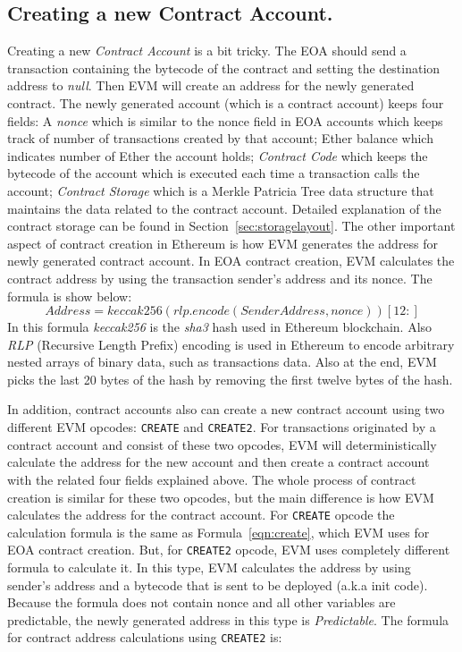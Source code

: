 \subsection{Creating a new Contract Account.}
Creating a new \textit{Contract Account} is a bit tricky. The EOA should send a transaction containing the bytecode of the contract and setting the destination address to \emph{null}. Then EVM will create an address for the newly generated contract. The newly generated account (which is a contract account) keeps four fields: A \textit{nonce} which is similar to the nonce field in EOA accounts which keeps track of number of transactions created by that account; Ether balance which indicates number of Ether the account holds; \textit{Contract Code} which keeps the bytecode of the account which is executed each time a transaction calls the account; \textit{Contract Storage} which is a Merkle Patricia Tree data structure that maintains the data related to the contract account. Detailed explanation of the contract storage can be found in Section~\ref{sec:storagelayout}. 
The other important aspect of contract creation in Ethereum is how EVM generates the address for newly generated contract account. In EOA contract creation, EVM calculates the contract address by using the transaction sender's address and its nonce. The formula is show below:
\begin{equation}
    \label{eqn:create}
    Address = keccak256(rlp.encode(Sender Address, nonce))[12:]
\end{equation}
In this formula \textit{keccak256} is the \textit{sha3} hash used in Ethereum blockchain. Also \textit{RLP} (Recursive Length Prefix) encoding is used in Ethereum to encode arbitrary nested arrays of binary data, such as transactions data. Also at the end, EVM picks the last 20 bytes of the hash by removing the first twelve bytes of the hash.

In addition, contract accounts also can create a new contract account using two different EVM opcodes: \texttt{CREATE} and \texttt{CREATE2}. For transactions originated by a contract account and consist of these two opcodes, EVM will deterministically calculate the address for the new account and then create a contract account with the related four fields explained above. The whole process of contract creation is similar for these two opcodes, but the main difference is how EVM calculates the address for the contract account. For \texttt{CREATE} opcode the calculation formula is the same as Formula~\ref{eqn:create}, which EVM uses for EOA contract creation. But, for \texttt{CREATE2} opcode, EVM uses completely different formula to calculate it. In this type, EVM calculates the address by using sender's address and a bytecode that is sent to be deployed (a.k.a init code). Because the formula does not contain nonce and all other variables are predictable, the newly generated address in this type is \emph{Predictable}. The formula for contract address calculations using \texttt{CREATE2} is:

